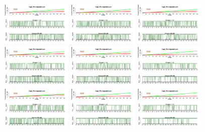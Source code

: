 \documentclass[a4paper ]{article}
\begin{document}
\begin{figure}[th]
\centering
\includegraphics[width=0.3\textwidth]{Figures/Success_Exp2_P1} \includegraphics[width=0.3\textwidth]{Figures/Success_Exp2_P2} \includegraphics[width=0.3\textwidth]{Figures/Success_Exp2_P3}
\includegraphics[width=0.3\textwidth]{Figures/Success_Exp2_P4} \includegraphics[width=0.3\textwidth]{Figures/Success_Exp2_P5} \includegraphics[width=0.3\textwidth]{Figures/Success_Exp2_P6}
\includegraphics[width=0.3\textwidth]{Figures/Success_Exp2_P7} \includegraphics[width=0.3\textwidth]{Figures/Success_Exp2_P8} \includegraphics[width=0.3\textwidth]{Figures/Success_Exp2_P9}

\end{figure}
\end{document}
